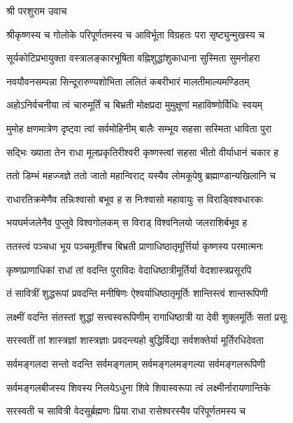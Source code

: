 
श्री परशुराम उवाच\nopagebreak[4]

\twolineshloka
{श्रीकृष्णस्य च गोलोके परिपूर्णतमस्य च}
{आविर्भूता विग्रहतः परा सृष्ट्युन्मुखस्य च}

\twolineshloka
{सूर्यकोटिप्रभायुक्ता वस्त्रालङ्कारभूषिता}
{वह्निशुद्धांशुकाधाना सुस्मिता सुमनोहरा}

\twolineshloka
{नवयौवनसम्पन्ना सिन्दूरारुण्यशोभिता}
{ललितं कबरीभारं मालतीमाल्यमण्डितम्}

\twolineshloka
{अहोऽनिर्वचनीया त्वं चारुमूर्तिं च बिभ्रती}
{मोक्षप्रदा मुमुक्षूणां महाविष्णोर्विधिः स्वयम्}

\twolineshloka
{मुमोह क्षणमात्रेण दृष्ट्वा त्वां सर्वमोहिनीम्}
{बालैः सम्भूय सहसा सस्मिता धाविता पुरा}

\twolineshloka
{सद्भिः ख्याता तेन राधा मूलप्रकृतिरीश्वरी}
{कृष्णस्त्वां सहसा भीतो वीर्याधानं चकार ह}

\twolineshloka
{ततो डिम्भं महज्जज्ञे ततो जातो महान्विराट्}
{यस्यैव लोमकूपेषु ब्रह्माण्डान्यखिलानि च}

\twolineshloka
{राधारतिक्रमेणैव तन्निःश्वासो बभूव ह}
{स निःश्वासो महावायुः स विराड्\mbox{}विश्वधारकः}

\twolineshloka
{भयघर्मजलेनैव पुप्लुवे विश्वगोलकम्}
{स विराड् विश्वनिलयो जलराशिर्बभूव ह}

\twolineshloka
{ततस्त्वं पञ्चधा भूय पञ्चमूर्तीश्च बिभ्रती}
{प्राणाधिष्ठातृमूर्त्तिर्या कृष्णस्य परमात्मनः}

\twolineshloka
{कृष्णप्राणाधिकां राधां तां वदन्ति पुराविदः}
{वेदाधिष्ठात्रीमूर्तिर्या वेदशास्त्रप्रसूरपि}

\twolineshloka
{तं सावित्रीं शुद्धरूपां प्रवदन्ति मनीषिणः}
{ऐश्वर्याधिष्ठातृमूर्तिः शान्तिस्त्वं शान्तरूपिणी}

\twolineshloka
{लक्ष्मीं वदन्ति संतस्तां शुद्धां सत्त्‍‌वस्वरूपिणीम्}
{रागाधिष्ठात्री या देवी शुक्लमूर्तिः सतां प्रसूः}

\twolineshloka
{सरस्वतीं तां शास्त्रज्ञां शास्त्रज्ञाः प्रवदन्त्यहो}
{बुद्धिर्विद्या सर्वशक्तेर्या मूर्तिरधिदेवता}

\twolineshloka
{सर्वमङ्गलदा सन्तो वदन्ति सर्वमङ्गलाम्}
{सर्वमङ्गलमङ्गल्या सर्वमङ्गलरूपिणी}

\twolineshloka
{सर्वमङ्गलबीजस्य शिवस्य निलयेऽधुना}
{शिवे शिवास्वरूपा त्वं लक्ष्मीर्नारायणान्तिके}

\twolineshloka
{सरस्वती च सावित्री वेदसू‌र्ब्रह्मणः प्रिया}
{राधा रासेश्वरस्यैव परिपूर्णतमस्य च}

